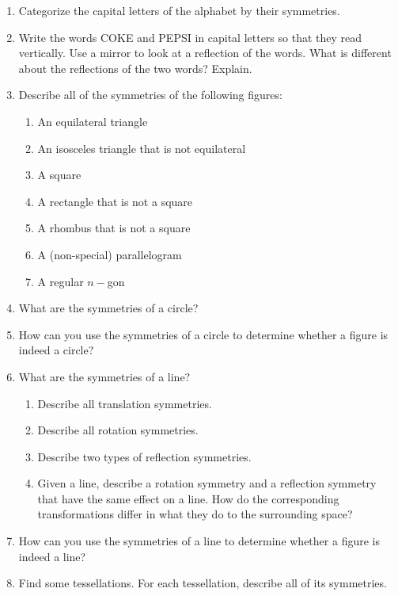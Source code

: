 \begin{problems}
\begin{enumerate}
\item Categorize the capital letters of the alphabet by their symmetries.  

\item Write the words COKE and PEPSI in capital letters so that they read vertically.  Use a mirror to look at a reflection of the words.  What is different about the reflections of the two words?  Explain.  

\item Describe all of the symmetries of the following figures: 
\begin{enumerate}
\item An equilateral triangle
\item An isosceles triangle that is not equilateral
\item A square
\item A rectangle that is not a square
\item A rhombus that is not a square
\item A (non-special) parallelogram
\item A regular $n-$gon
\end{enumerate}

\item What are the symmetries of a circle? 

\item How can you use the symmetries of a circle to determine whether a figure is indeed a circle?  

\item What are the symmetries of a line?  
\begin{enumerate}
\item Describe all translation symmetries.  
\item Describe all rotation symmetries.
\item Describe two types of reflection symmetries.
\item Given a line, describe a rotation symmetry and a reflection symmetry that have the same effect on a line.  How do the corresponding transformations differ in what they do to the surrounding space?  
\end{enumerate}

\item How can you use the symmetries of a line to determine whether a figure is indeed a line? 

\item Find some tessellations.  For each tessellation, describe all of its symmetries.  

\end{enumerate}

\end{problems}

